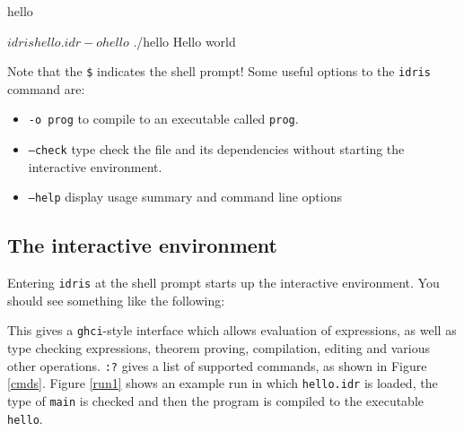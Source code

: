 \begin{SaveVerbatim}{hello}

$ idris hello.idr -o hello
$ ./hello
Hello world

\end{SaveVerbatim}

\noindent
Note that the \texttt{\$} indicates the shell prompt! Some useful options to the
\texttt{idris} command are:

\begin{itemize}
\item \texttt{-o prog} to compile to an executable called \texttt{prog}.
\item \texttt{--check} type check the file and its dependencies without starting the 
interactive environment.
\item \texttt{--help} display usage summary and command line options
\end{itemize}

\subsection{The interactive environment}

Entering \texttt{idris} at the shell prompt starts up the interactive
environment. You should see something like the following:



\noindent
This gives a \texttt{ghci}-style interface which allows evaluation of expressions,
as well as type checking expressions, theorem proving, compilation, editing
and various other operations. \texttt{:?} gives a list of supported commands,
as shown in Figure \ref{cmds}. Figure \ref{run1} shows an example run in which
\texttt{hello.idr} is loaded, the type of \texttt{main} is checked and then
the program is compiled to the executable \texttt{hello}.

